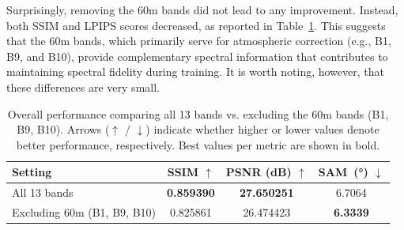Surprisingly, removing the 60m bands did not lead to any improvement. Instead, both SSIM and LPIPS scores decreased, as reported in Table~\ref{tab:ablation_excluding_60m}. This suggests that the 60m bands, which primarily serve for atmospheric correction (e.g., B1, B9, and B10), provide complementary spectral information that contributes to maintaining spectral fidelity during training. It is worth noting, however, that these differences are very small.

\begin{table}[!htbp]
    \centering
    \setlength{\tabcolsep}{8pt}
    \renewcommand{\arraystretch}{1.15}
    \caption[Overall performance when excluding 60m bands]{Overall performance comparing all 13 bands vs. excluding the 60m bands (B1, B9, B10). Arrows ($\uparrow$ / $\downarrow$) indicate whether higher or lower values denote better performance, respectively. Best values per metric are shown in bold.}
    \label{tab:ablation_excluding_60m}
    \begin{tabular}{lccc}
        \hline
        \textbf{Setting} & \textbf{SSIM $\uparrow$} & \textbf{PSNR (dB) $\uparrow$} & \textbf{SAM~(°) $\downarrow$} \\
        \hline
        All 13 bands & \textbf{0.859390} & \textbf{27.650251} & 6.7064 \\
        Excluding 60m (B1, B9, B10) & 0.825861 & 26.474423 & \textbf{6.3339} \\
        \hline
    \end{tabular}
\end{table}

